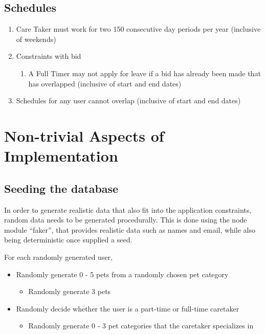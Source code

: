 \documentclass[
  paper=a4,
  ,captions=tableheading
]{scrartcl}
\providecommand{\tightlist}{%
  \setlength{\itemsep}{0pt}\setlength{\parskip}{0pt}}
\begin{document}
\hypertarget{schedules-1}{%
\subsection{Schedules}\label{schedules-1}}

\begin{enumerate}
\def\labelenumi{\arabic{enumi}.}
\tightlist
\item
  Care Taker must work for two 150 consecutive day periods per year
  (inclusive of weekends)
\item
  Constraints with bid

  \begin{enumerate}
  \def\labelenumii{\arabic{enumii}.}
  \tightlist
  \item
    A Full Timer may not apply for leave if a bid has already been made
    that has overlapped (inclusive of start and end dates)
  \end{enumerate}
\item
  Schedules for any user cannot overlap (inclusive of start and end
  dates)
\end{enumerate}

\hypertarget{non-trivial-aspects-of-implementation}{%
\section{Non-trivial Aspects of
Implementation}\label{non-trivial-aspects-of-implementation}}

\hypertarget{seeding-the-database}{%
\subsection{Seeding the database}\label{seeding-the-database}}

In order to generate realistic data that also fit into the application
constraints, random data needs to be generated procedurally. This is
done using the node module ``faker'', that provides realistic data such
as names and email, while also being deterministic once supplied a seed.

For each randomly generated user,

\begin{itemize}
\tightlist
\item
  Randomly generate 0 - 5 pets from a randomly chosen pet category

  \begin{itemize}
  \tightlist
  \item
    Randomly generate 3 pets
  \end{itemize}
\item
  Randomly decide whether the user is a part-time or full-time caretaker

  \begin{itemize}
  \tightlist
  \item
    Randomly generate 0 - 3 pet categories that the caretaker
    specializes in
  \end{itemize}
\end{itemize}
\end{document}
